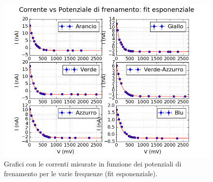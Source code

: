 \documentclass[10pt,a4paper]{article}
\begin{document}
\begin{figure}[!htb]
\centering
\includegraphics[scale=0.9]{fitesponenziale.png}
\caption{Grafici con le correnti misurate in funzione dei potenziali di frenamento per le varie frequenze (fit esponenziale).\label{fig:fitexp}}
\end{figure}
\end{document}
